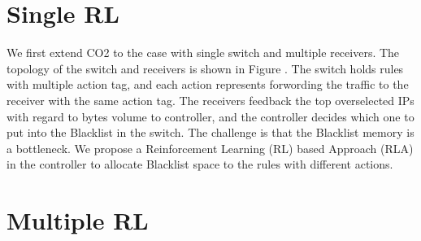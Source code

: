 \documentclass[a4paper,10pt]{article}
\title{}
\author{}
\begin{document}
\maketitle

\section{Single RL}
  We first extend CO2 to the case with single switch and multiple receivers. The topology of the switch and receivers is shown in Figure {}. The switch holds rules with multiple action tag, and each action represents forwording the traffic to the receiver with the same action tag. The receivers feedback the top overselected IPs with regard to bytes volume to controller, and the controller decides which one to put into the Blacklist in the switch. The challenge is that the Blacklist memory is a bottleneck. We propose a Reinforcement Learning (RL) based Approach (RLA) in the controller to allocate Blacklist space to the rules with different actions.
  
  
  
  
\section{Multiple RL}
\end{document}

